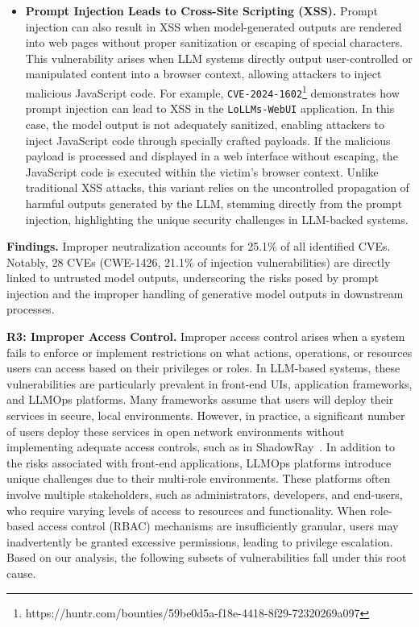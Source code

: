 \begin{itemize}[leftmargin=10pt]
    \item \textbf{Prompt Injection Leads to Cross-Site Scripting (XSS).}  
    Prompt injection can also result in XSS when model-generated outputs are rendered into web pages without proper sanitization or escaping of special characters. This vulnerability arises when LLM systems directly output user-controlled or manipulated content into a browser context, allowing attackers to inject malicious JavaScript code. For example, \texttt{CVE-2024-1602}\footnote{https://huntr.com/bounties/59be0d5a-f18e-4418-8f29-72320269a097} demonstrates how prompt injection can lead to XSS in the \texttt{LoLLMs-WebUI} application. In this case, the model output is not adequately sanitized, enabling attackers to inject JavaScript code through specially crafted payloads. If the malicious payload is processed and displayed in a web interface without escaping, the JavaScript code is executed within the victim's browser context. Unlike traditional XSS attacks, this variant relies on the uncontrolled propagation of harmful outputs generated by the LLM, stemming directly from the prompt injection, highlighting the unique security challenges in LLM-backed systems.
\end{itemize}

\begin{tcolorbox}
\textbf{Findings.} Improper neutralization accounts for 25.1\% of all identified CVEs. Notably, 28 CVEs (CWE-1426, 21.1\% of injection vulnerabilities) are directly linked to untrusted model outputs, underscoring the risks posed by prompt injection and the improper handling of generative model outputs in downstream processes.
\end{tcolorbox}

\noindent \textbf{R3: Improper Access Control.}  
Improper access control arises when a system fails to enforce or implement restrictions on what actions, operations, or resources users can access based on their privileges or roles. In LLM-based systems, these vulnerabilities are particularly prevalent in front-end UIs, application frameworks, and LLMOps platforms. Many frameworks assume that users will deploy their services in secure, local environments. However, in practice, a significant number of users deploy these services in open network environments without implementing adequate access controls, such as in ShadowRay~\cite{shadowray}. 
In addition to the risks associated with front-end applications, LLMOps platforms introduce unique challenges due to their multi-role environments. These platforms often involve multiple stakeholders, such as administrators, developers, and end-users, who require varying levels of access to resources and functionality. When role-based access control (RBAC) mechanisms are insufficiently granular, users may inadvertently be granted excessive permissions, leading to privilege escalation. 
Based on our analysis, the following subsets of vulnerabilities fall under this root cause.


